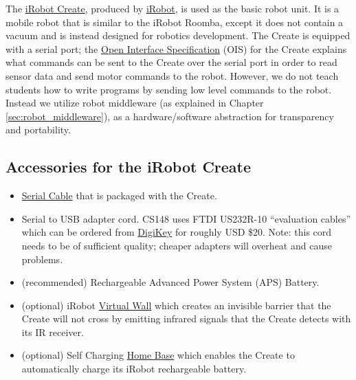 The \href{http://store.irobot.com/shop/index.jsp?categoryId=3311368}{iRobot Create}, produced by \href{http://www.irobot.com/}{iRobot}, is used as the basic robot unit.  It is a mobile robot that is similar to the iRobot Roomba, except it does not contain a vacuum and is instead designed for robotics development.  The Create is equipped with a serial port; the \href{http://www.irobot.com/filelibrary/create/Create_Open_Interface_v6.pdf}{Open Interface Specification} (OIS) for the Create explains what commands can be sent to the Create over the serial port in order to read sensor data and send motor commands to the robot.  However, we do not 
teach students how to write programs by sending low level commands to the robot. Instead we utilize robot middleware (as explained in Chapter \ref{sec:robot_middleware}), as a hardware/software abstraction for transparency and portability.

\subsection{Accessories for the iRobot Create}
\begin{itemize}
\item \href{http://store.irobot.com/product/index.jsp?productId=2586254}{Serial Cable} that is packaged with the Create.

\item Serial to USB adapter cord.  CS148 uses FTDI US232R-10 ``evaluation cables'' which can be ordered from \href{www.digikey.com}{DigiKey} for roughly USD \$20.  Note: this cord needs to be of sufficient quality; cheaper adapters will overheat and cause problems.

\item (recommended) Rechargeable Advanced Power System (APS) Battery.

\item (optional) iRobot \href{http://store.irobot.com/product/index.jsp?productId=2731666&cp=2804606.3335976&ab=CMS_IRBT_CreateSuperCat_CreateAcc_111309&parentPage=family}{Virtual Wall} which creates an invisible barrier that the Create will not cross by emitting infrared signals that the Create detects with its IR receiver. 

\item (optional) Self Charging \href{http://store.irobot.com/product/index.jsp?productId=2598729&cp=2804606.3335976&ab=CMS_IRBT_CreateSuperCat_CreateAcc_111309&parentPage=family}{Home Base} which enables the Create to automatically charge its iRobot rechargeable battery.
\end{itemize}

